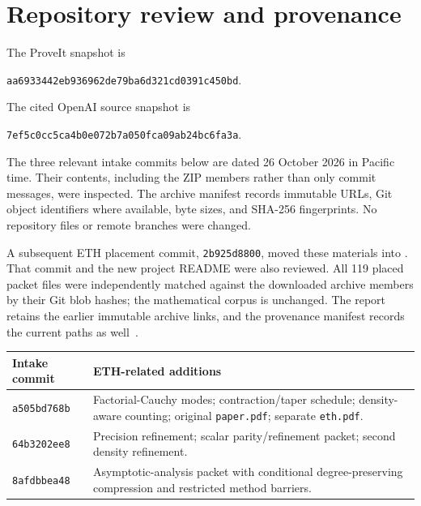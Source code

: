 \documentclass[11pt,letterpaper]{article}
\theoremstyle{definition}\newtheorem{definition}[theorem]{Definition}
\theoremstyle{remark}\newtheorem{remark}[theorem]{Remark}
\newcommand{\ppin}{aa6933442eb936962de79ba6d321cd0391c450bd}
\newcommand{\opin}{7ef5c0cc5ca4b0e072b7a050fca09ab24bc6fa3a}
\begin{document}
\section{Repository review and provenance}\label{sec:review}
The ProveIt snapshot is
\begin{center}\small\texttt{\ppin}.\end{center}
The cited OpenAI source snapshot is
\begin{center}\small\texttt{\opin}.\end{center}
The three relevant intake commits below are dated 26 October 2026 in
Pacific time. Their contents, including the ZIP members rather than only
commit messages, were inspected. The archive manifest records immutable
URLs, Git object identifiers where available, byte sizes, and SHA-256
fingerprints. No repository files or remote branches were changed.

A subsequent ETH placement commit, \texttt{2b925d8800}, moved these
materials into .
That commit and the new project README were also reviewed. All 119
placed packet files were independently matched against the downloaded
archive members by their Git blob hashes; the mathematical corpus is
unchanged. The report retains the earlier immutable archive links, and
the provenance manifest records the current paths as well~\cite{placement}.

\begin{table}[ht]
\centering\small
\begin{tabularx}{\textwidth}{@{}p{}X@{}}
\toprule
Intake commit & ETH-related additions\\
\midrule
\texttt{a505bd768b} & Factorial-Cauchy modes; contraction/taper schedule;
 density-aware counting; original \texttt{paper.pdf}; separate
 \texttt{eth.pdf}.\\
\texttt{64b3202ee8} & Precision refinement; scalar parity/refinement packet;
 second density refinement.\\
\texttt{8afdbbea48} & Asymptotic-analysis packet with conditional
 degree-preserving compression and restricted method barriers.\\
\bottomrule
\end{tabularx}
\end{table}

\end{document}
